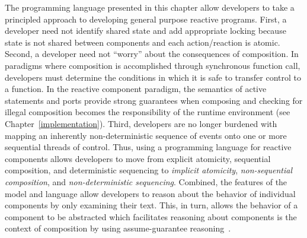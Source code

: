 The programming language presented in this chapter allow developers to take a principled approach to developing general purpose reactive programs.
First, a developer need not identify shared state and add appropriate locking because state is not shared between components and each action/reaction is atomic.
Second, a developer need not ``worry'' about the consequences of composition.
In paradigms where composition is accomplished through synchronous function call, developers must determine the conditions in which it is safe to transfer control to a function.
In the reactive component paradigm, the semantics of active statements and ports provide strong guarantees when composing and checking for illegal composition becomes the responsibility of the runtime environment (see Chapter~\ref{implementation}).
Third, developers are no longer burdened with mapping an inherently non-deterministic sequence of events onto one or more sequential threads of control.
Thus, using a programming language for reactive components allows developers to move from explicit atomicity, sequential composition, and deterministic sequencing to \emph{implicit atomicity}, \emph{non-sequential composition}, and \emph{non-deterministic sequencing}.
Combined, the features of the model and language allow developers to reason about the behavior of individual components by only examining their text.
This, in turn, allows the behavior of a component to be abstracted which facilitates reasoning about components is the context of composition by using assume-guarantee reasoning~\cite{Jones:1983:TST:69575.69577}.
